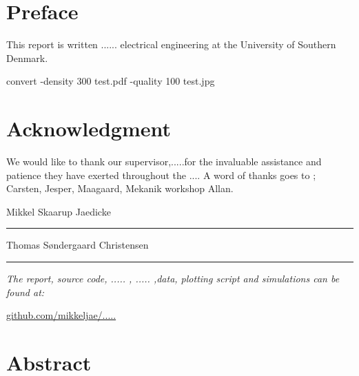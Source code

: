 
\section*{Preface}
This report is written ...... electrical engineering at the University of Southern Denmark.

convert -density 300 test.pdf -quality 100 test.jpg

\section*{Acknowledgment}

We would like to thank our supervisor,.....for the invaluable assistance and patience they have exerted throughout the ....
A word of thanks goes to ; Carsten, Jesper, Maagaard, Mekanik workshop Allan.


\vspace{1cm}
\begin{center}
	\begin{minipage}[t]{.49\textwidth}\large
		\begin{center}
		Mikkel Skaarup Jaedicke\\
		\vspace{1cm}
		\hrule
		\vspace{0.5cm}
		Thomas Søndergaard Christensen
		\vspace{1cm}
		\hrule
		\end{center} 
	\end{minipage}
\end{center}

\vspace{1.2cm}
  \begin{center}
    \textsl{The report, source code, ..... , ..... ,data, plotting script and simulations can be found at:}  
    \end{center}
    \vspace{-5pt}
    \begin{center}
	\renewcommand{\UrlFont}{\color{black}\normalsize\tt}
    \url{github.com/mikkeljae/.....}
   \end{center}
\newpage

\section*{Abstract}
\lipsum[5]